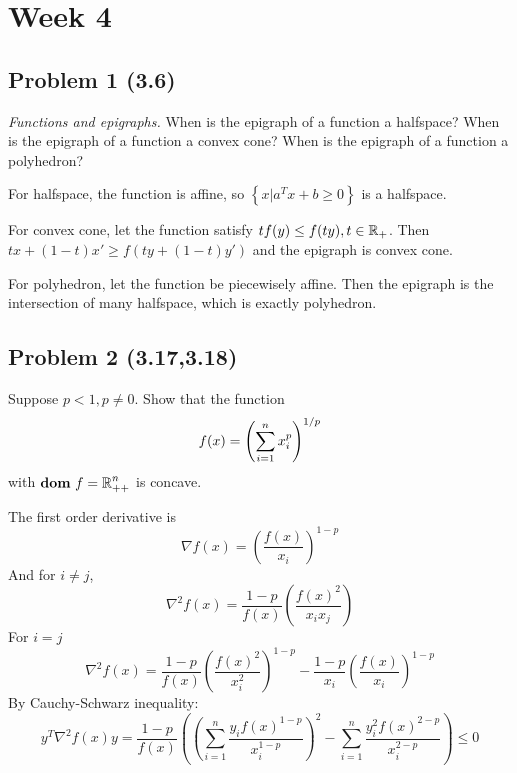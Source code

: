 \documentclass[en,hazy,blue,10pt,device = normal]{elegantnote}
\begin{document}
\section*{Week 4}
\subsection*{Problem 1 (3.6)}
\textit{Functions and epigraphs.} When is the epigraph of a function a halfspace? When is the epigraph of a function a convex cone? When is the epigraph of a function a polyhedron?

\begin{tcolorbox}
    \sol

    For halfspace, the function is affine, so \(\left\{x | a^T x + b \geq 0 \right\}\) is a halfspace.

    For convex cone, let the function satisfy \(tf(y) \leq f(ty), t \in \operatorname{\mathbb R}_+\). Then \(tx + (1-t) x' \geq f(ty+(1-t)y')\) and the epigraph is convex cone.

    For polyhedron, let the function be piecewisely affine. Then the epigraph is the intersection of many halfspace, which is exactly polyhedron.
\end{tcolorbox}

\subsection*{Problem 2 (3.17,3.18)}
Suppose \(p < 1, p \neq 0\). Show that the function
\[f(x) = \left( \sum_{i=1}^{n} x_i^p \right)^{1/p}\]
with \({\textbf{dom}\ } f = \operatorname{\mathbb R}_{++}^n\) is concave.

\begin{tcolorbox}
    \sol

            
    The first order derivative is 
    \[\nabla f(x) = \left( \frac{f(x)}{x_i} \right)^{1-p}\]
    And for \(i \neq j \),
    \[\nabla ^2 f(x) = \frac{1-p}{f(x)} \left( \frac{f(x)^2}{x_i x_j } \right)\]
    For \(i = j \)
    \[\nabla ^2 f(x) = \frac{1-p}{f(x)}\left(\frac{f(x)^2}{x_i^2}\right)^{1-p}-\frac{1-p}{x_i}\left(\frac{f(x)}{x_i}\right)^{1-p}\]
    By Cauchy-Schwarz inequality:
    \[y^T \nabla^2 f(x) y=\frac{1-p}{f(x)}\left(\left(\sum_{i=1}^n \frac{y_i f(x)^{1-p}}{x_i^{1-p}}\right)^2-\sum_{i=1}^n \frac{y_i^2 f(x)^{2-p}}{x_i^{2-p}}\right) \leq 0\]
\end{tcolorbox}
\end{document}
